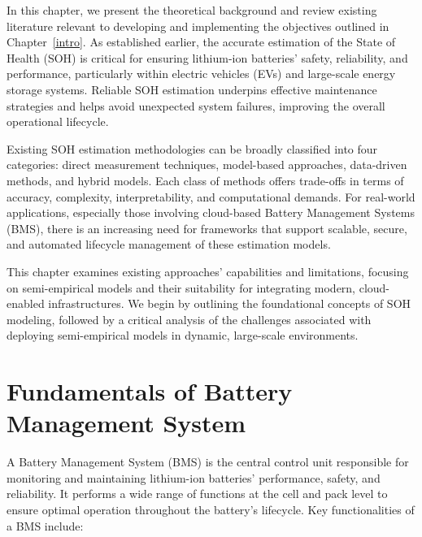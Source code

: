 In this chapter, we present the theoretical background and review existing literature relevant to developing and implementing the objectives outlined in Chapter~\ref{intro}. As established earlier, the accurate estimation of the State of Health (SOH) is critical for ensuring lithium-ion batteries' safety, reliability, and performance, particularly within electric vehicles (EVs) and large-scale energy storage systems. Reliable SOH estimation underpins effective maintenance strategies and helps avoid unexpected system failures, improving the overall operational lifecycle.

Existing SOH estimation methodologies can be broadly classified into four categories: direct measurement techniques, model-based approaches, data-driven methods, and hybrid models. Each class of methods offers trade-offs in terms of accuracy, complexity, interpretability, and computational demands. For real-world applications, especially those involving cloud-based Battery Management Systems (BMS), there is an increasing need for frameworks that support scalable, secure, and automated lifecycle management of these estimation models.

This chapter examines existing approaches' capabilities and limitations, focusing on semi-empirical models and their suitability for integrating modern, cloud-enabled infrastructures. We begin by outlining the foundational concepts of SOH modeling, followed by a critical analysis of the challenges associated with deploying semi-empirical models in dynamic, large-scale environments.

\section{Fundamentals of Battery Management System}

A Battery Management System (BMS) is the central control unit responsible for monitoring and maintaining lithium-ion batteries' performance, safety, and reliability. It performs a wide range of functions at the cell and pack level to ensure optimal operation throughout the battery's lifecycle. Key functionalities of a BMS include:


